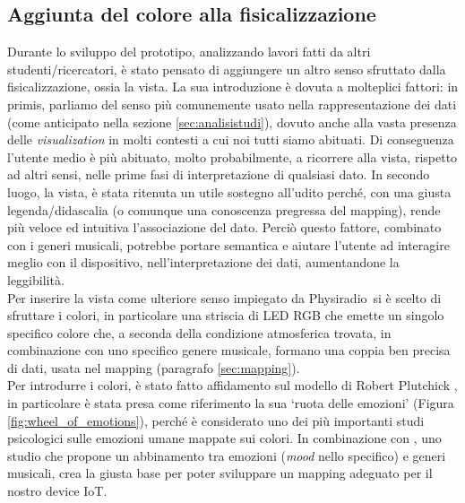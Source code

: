 \documentclass[12pt,a4paper]{report}
\newcommand{\physiradio}{Physiradio} %
\begin{document}
\subsection{Aggiunta del colore alla fisicalizzazione}\label{sec:colors}

Durante lo sviluppo del prototipo, analizzando lavori fatti da altri studenti/ricercatori, è stato pensato di aggiungere un altro senso sfruttato dalla fisicalizzazione, ossia la vista. La sua introduzione è dovuta a molteplici fattori: in primis, parliamo del senso più comunemente usato nella rappresentazione dei dati (come anticipato nella sezione \ref{sec:analisistudi}), dovuto anche alla vasta presenza delle \textit{visualization} in molti contesti a cui noi tutti siamo abituati. Di conseguenza l'utente medio è più abituato, molto probabilmente, a ricorrere alla vista, rispetto ad altri sensi, nelle prime fasi di interpretazione di qualsiasi dato. In secondo luogo, la vista, è stata ritenuta un utile sostegno all'udito perché, con una giusta legenda/didascalia (o comunque una conoscenza pregressa del mapping), rende più veloce ed intuitiva l'associazione del dato. %
Perciò questo fattore, combinato con i generi musicali, potrebbe portare semantica e aiutare l'utente ad interagire meglio con il dispositivo, nell'interpretazione dei dati, aumentandone la leggibilità.\\ 

Per inserire la vista come ulteriore senso impiegato da \physiradio\ si è scelto di sfruttare i colori, in particolare una striscia di LED RGB che emette un singolo specifico colore che, a seconda della condizione atmosferica trovata, in combinazione con uno specifico genere musicale, formano una coppia ben precisa di dati, usata nel mapping (paragrafo \ref{sec:mapping}).\\
Per introdurre i colori, è stato fatto affidamento sul modello di Robert Plutchick \cite{plutchik2001nature}, in particolare è stata presa come riferimento la sua `ruota delle emozioni' (Figura \ref{fig:wheel_of_emotions}), perché è considerato uno dei più importanti studi psicologici sulle emozioni umane mappate sui colori. In combinazione con \cite{predictingmoodonmusicgenre}, uno studio che propone un abbinamento tra emozioni (\textit{mood} nello specifico) e generi musicali, crea la giusta base per poter sviluppare un mapping adeguato per il nostro device IoT. 
\end{document}
